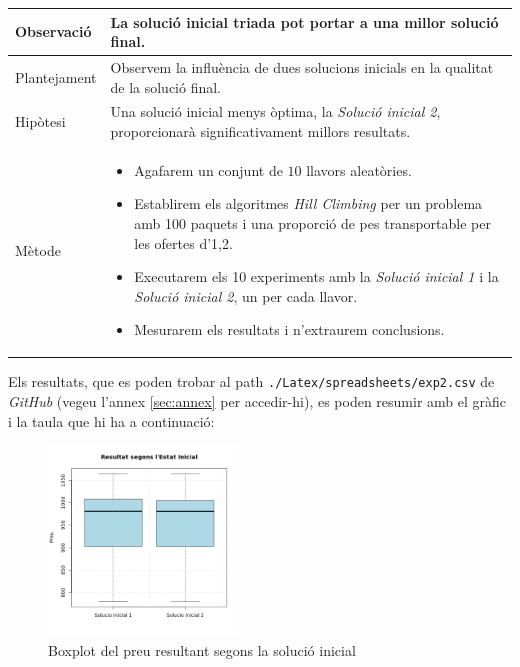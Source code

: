 \documentclass[a4paper]{article}
\begin{document}
	\begin{table}[ht]
		\centering
		\begin{tabular}{|l|p{10cm}|}
			\hline
			Observació & La solució inicial triada pot portar a una millor solució final. \\
			\hline
			Plantejament & Observem la influència de dues solucions inicials en la qualitat de la solució final. \\
			\hline
			Hipòtesi & Una solució inicial menys òptima, la \textit{Solució inicial 2}, proporcionarà significativament millors resultats.\\
			\hline
			Mètode & 
			\begin{itemize}
				\item Agafarem un conjunt de $10$ llavors aleatòries.
				\item Establirem els algoritmes \textit{Hill Climbing} per un problema amb 100 paquets i una proporció de pes transportable per les ofertes d'1,2.
				\item Executarem els 10 experiments amb la \textit{Solució inicial 1} i la \textit{Solució inicial 2}, un per cada llavor.
				\item Mesurarem els resultats i n'extraurem conclusions.
			\end{itemize} \\
			\hline
		\end{tabular}
		\label{tab:exp2_apartats}
	\end{table}
	
	Els resultats, que es poden trobar al path \texttt{./Latex/spreadsheets/exp2.csv} de \textit{GitHub} (vegeu l'annex \ref{sec:annex} per accedir-hi), es poden resumir amb el gràfic i la taula que hi ha a continuació:
	
	\begin{figure}[H]
		\centering
		\includegraphics[width=0.45\textwidth]{images/exp2_boxplot.png}
		\caption{Boxplot del preu resultant segons la solució inicial}
		\label{fig:exp2_boxplot}
	\end{figure}
	
\end{document}
